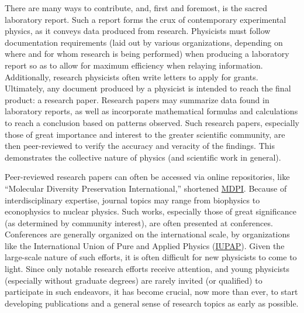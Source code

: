 \begin{justify}
  \hspace{.5in} There are many ways to contribute, and, first and foremost,  is the sacred laboratory report. Such a report forms the crux of contemporary experimental physics, as it conveys data produced from research. Physicists must follow documentation requirements (laid out by various organizations, depending on where and for whom research is being performed) when producing a laboratory report so as to allow for maximum efficiency when relaying information. Additionally, research physicists often write letters to apply for grants. Ultimately, any document produced by a physicist is intended to reach the final product: a research paper. Research papers may summarize data found in laboratory reports, as well as incorporate mathematical formulas and calculations to reach a conclusion based on patterns observed. Such research papers, especially those of great importance and interest to the greater scientific community, are then peer-reviewed to verify the accuracy and veracity of the findings. This demonstrates the collective nature of physics (and scientific work in general).

  \hspace{.5in} Peer-reviewed research papers can often be accessed via online repositories, like ``Molecular Diversity Preservation International,'' shortened \href{https://www.mdpi.com/}{MDPI}. Because of interdisciplinary expertise, journal topics may range from biophysics to econophysics to nuclear physics. Such works, especially those of great significance (as determined by community interest), are often presented at conferences. Conferences are generally organized on the international scale, by organizations like the International Union of Pure and Applied Physics (\href{https://iupap.org/}{IUPAP}). Given the large-scale nature of such efforts, it is often difficult for new physicists to come to light. Since only notable research efforts receive attention, and young physicists (especially without graduate degrees) are rarely invited (or qualified) to participate in such endeavors, it has become crucial, now more than ever, to start developing publications and a general sense of research topics as early as possible.


\end{justify}
